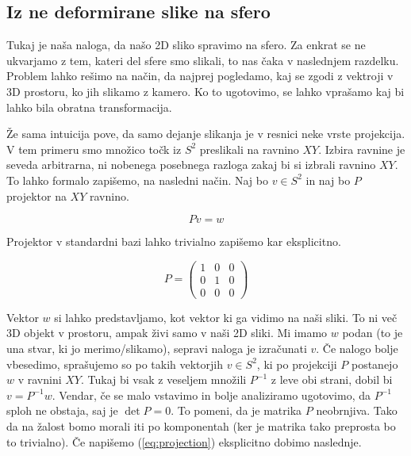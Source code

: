 \documentclass{article}
\begin{document}
\subsection{Iz ne deformirane slike na sfero}
Tukaj je naša naloga, da našo 2D sliko spravimo na sfero. Za enkrat se ne ukvarjamo z tem, kateri del sfere smo
slikali, to nas čaka v naslednjem razdelku. Problem lahko rešimo na način, da najprej pogledamo, kaj se
zgodi z vektroji v 3D prostoru, ko jih slikamo z kamero. Ko to ugotovimo, se lahko vprašamo kaj bi lahko bila
obratna transformacija.

Že sama intuicija pove, da samo dejanje slikanja je v resnici neke vrste projekcija. V tem primeru smo
množico točk iz $S^2$ preslikali na ravnino $XY$. Izbira ravnine je seveda arbitrarna, ni nobenega posebnega
razloga zakaj bi si izbrali ravnino $XY$. To lahko formalo zapišemo, na nasledni način. Naj bo
$v \in S^2$ in naj bo $P$ projektor na $XY$ ravnino. 

\begin{equation}
	P v = w
	\label{eq:projection}
\end{equation}

Projektor v standardni bazi lahko trivialno zapišemo kar eksplicitno.

\begin{equation}
	P = 
	\begin{pmatrix}
		1 & 0 & 0 \\
		0 & 1 & 0 \\
		0 & 0 & 0
	\end{pmatrix}
	\label{eq:projector}
\end{equation}

Vektor $w$ si lahko predstavljamo, kot vektor ki ga vidimo na naši sliki. To ni več 3D objekt v
prostoru, ampak živi samo v naši 2D sliki. Mi imamo $w$ podan 
(to je una stvar, ki jo merimo/slikamo), sepravi naloga je izračunati $v$. Če nalogo bolje vbesedimo, sprašujemo so po takih vektorjih $v \in S^2$, ki po projekciji $P$ postanejo $w$ v 
ravnini $XY$. Tukaj bi vsak z veseljem množili $P^{-1}$ z leve obi strani, dobil bi
$v = P^{-1} w$. Vendar, če se malo vstavimo in bolje analiziramo ugotovimo, da $P^{-1}$
sploh ne obstaja, saj je $\det P = 0$. To pomeni, da je matrika $P$ neobrnjiva. Tako da na žalost bomo morali
iti po komponentah (ker je matrika tako preprosta bo to trivialno). Če napišemo (\ref{eq:projection}) eksplicitno
dobimo naslednje.
\end{document}
